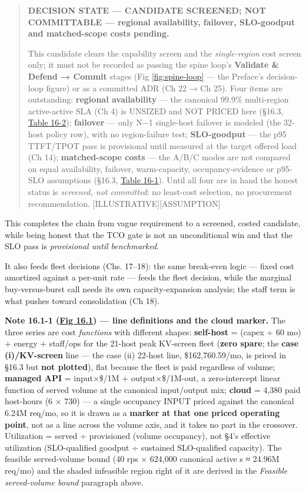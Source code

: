 \begin{quote}
\textbf{DECISION STATE --- CANDIDATE SCREENED; NOT COMMITTABLE ---
regional availability, failover, SLO-goodput and matched-scope costs
pending.}

This candidate clears the capability screen and the \emph{single-region}
cost screen only; it must not be recorded as passing the spine loop's
\textbf{Validate \& Defend → Commit} stages (Fig \ref{fig:spine-loop}
--- the Preface's decision-loop figure) or as a committed ADR (Ch 22 →
Ch 25). Four items are outstanding: \textbf{regional availability} ---
the canonical 99.9\% multi-region active-active SLA (Ch 4) is UNSIZED
and NOT PRICED here (§16.3, \hyperref[tab:16.2]{Table 16-2}); \textbf{failover} --- only N−1
single-host failover is modeled (the 32-host policy row), with no
region-failure test; \textbf{SLO-goodput} --- the p95 TTFT/TPOT pass is
provisional until measured at the target offered load (Ch 14);
\textbf{matched-scope costs} --- the A/B/C modes are not compared on
equal availability, failover, warm-capacity, occupancy-evidence or
p95-SLO assumptions (§16.3, \hyperref[tab:16.1]{Table 16-1}). Until all four are in hand the
honest status is \emph{screened, not committed}: no least-cost
selection, no procurement recommendation.
\mbox{{[}ILLUSTRATIVE{]}}\hspace{0pt}\mbox{{[}ASSUMPTION{]}}
\end{quote}

This completes the chain from vague requirement to a screened, costed
candidate, while being honest that the TCO gate is not an unconditional
win and that the SLO pass is \emph{provisional until benchmarked}.

It also feeds fleet decisions (Chs. 17--18): the same break-even logic
--- fixed cost amortized against a per-unit rate --- feeds the fleet
decision, while the marginal buy-versus-burst call needs its own
capacity-expansion analysis; the staff term is what pushes toward
consolidation (Ch 18).

\textbf{Note 16.1-1 (\hyperref[fig:16.1]{Fig 16.1}) --- line definitions and the cloud
marker.} The three series are cost \emph{functions} with different
shapes: \textbf{self-host} = (capex ÷ 60 mo) + energy + staff/ops for
the 21-host peak KV-screen fleet (\textbf{zero spare}; the \textbf{case
(i)/KV-screen} line --- the case (ii) 22-host line, \$162,760.59/mo, is
priced in §16.3 but \textbf{not plotted}), flat because the fleet is
paid regardless of volume; \textbf{managed API} = input×\$/1M +
output×\$/1M-out, a zero-intercept linear function of served volume at
the canonical input/output mix; \textbf{cloud} = 4,380 paid host-hours
(6 × 730) --- a single occupancy INPUT priced against the canonical
6.24M req/mo, so it is drawn as a \textbf{marker at that one priced
operating point}, not as a line across the volume axis, and it takes no
part in the crossover. Utilization = served ÷ provisioned (volume
occupancy), not §4's effective utilization (SLO-qualified goodput ÷
sustained SLO-qualified capacity). The feasible served-volume bound (40
rps × 624,000 canonical active s ≈ 24.96M req/mo) and the shaded
infeasible region right of it are derived in the \emph{Feasible
served-volume bound} paragraph above.

